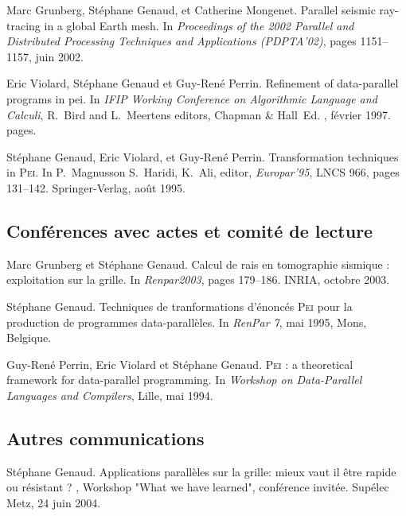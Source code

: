 \begin{thebibliography}{99}
Marc Grunberg, St\'{e}phane Genaud, et Catherine Mongenet.
\newblock Parallel seismic ray-tracing in a global {E}arth mesh.
\newblock In {\em Proceedings of the 2002 Parallel and Distributed Processing
  Techniques and Applications (PDPTA'02)}, pages 1151--1157, juin 2002.

Eric Violard, St\'{e}phane Genaud et Guy-Ren\'{e} Perrin.
\newblock Refinement of data-parallel programs in pei.
\newblock In {\em IFIP Working Conference on Algorithmic Language and Calculi}, 
R.~Bird and L.~Meertens editors, Chapman \& Hall~Ed. ,
février 1997.
 pages.

St\'{e}phane Genaud, Eric Violard, et Guy-Ren\'{e} Perrin.
\newblock Transformation techniques in \textsc{Pei}.
\newblock In P.~Magnusson S.~Haridi, K.~Ali, editor, {\em Europar'95}, LNCS
  966, pages 131--142. Springer-Verlag, août 1995.




\subsection*{Conf\'{e}rences avec actes et comité de lecture}
Marc Grunberg et St\'{e}phane Genaud.
\newblock Calcul de rais en tomographie sismique : exploitation sur la grille.
\newblock In {\em Renpar2003}, pages 179--186. INRIA, octobre 2003.

St\'{e}phane Genaud.
\newblock Techniques de tranformations d'\'{e}nonc\'{e}s \textsc{Pei} pour la
  production de programmes data-parall\`{e}les.
\newblock In {\em RenPar 7}, mai 1995, Mons, Belgique.

Guy-Ren\'{e} Perrin, Eric Violard et St\'{e}phane Genaud.
\newblock \textsc{Pei} : a theoretical framework for data-parallel programming.
\newblock In {\em Workshop on Data-Parallel Languages and Compilers}, Lille, mai 1994.
\vspace{3mm}


\subsection*{Autres communications}


St\'{e}phane Genaud.
\newblock Applications parallèles sur la grille: mieux vaut il être rapide ou résistant ? 
, Workshop "What we have learned", conférence invitée.
\newblock Supélec Metz, 24 juin 2004. 



\end{thebibliography}
